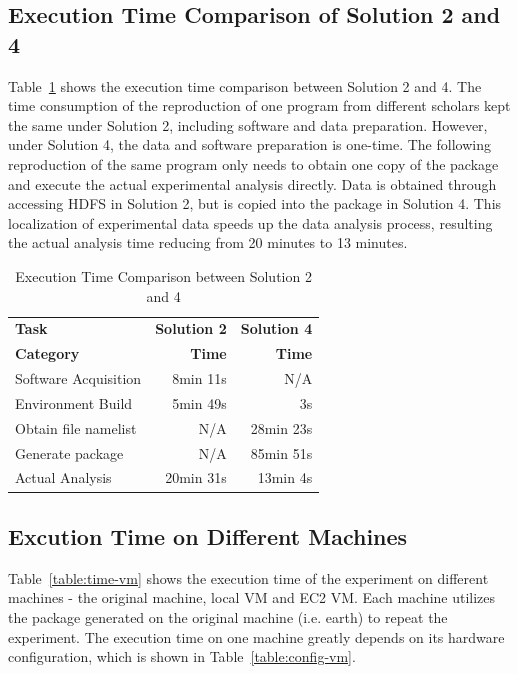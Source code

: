\documentclass{sig-alternate}
\begin{document}
\subsection{Execution Time Comparison of Solution 2 and 4}

Table~\ref{table:time-2nd3rd} shows the execution time comparison between
Solution 2 and 4. The time consumption of the reproduction of one program from
different scholars kept the same under Solution 2, including software and data
preparation. However, under Solution 4, the data and software preparation is
one-time. The following reproduction of the same program only needs to obtain
one copy of the package and execute the actual experimental analysis directly.
Data is obtained through accessing HDFS in Solution 2, but is copied into the package in Solution 4. This localization of experimental data speeds up the data analysis process, resulting the actual analysis time reducing from 20 minutes to 13 minutes.

\begin{table}
    \centering
    \begin{tabular}{|l|r|r|}
    \hline
    \bf Task & \bf Solution 2& \bf Solution 4\\ 
    \bf Category & \bf Time & \bf Time \\ \hline
    Software Acquisition & 8min 11s & N/A \\ \hline
    Environment Build & 5min 49s  & 3s \\ \hline
    Obtain file namelist & N/A & 28min 23s \\ \hline
    Generate package & N/A & 85min 51s \\ \hline
    Actual Analysis & 20min 31s & 13min 4s \\ \hline
    \end{tabular}
    \caption{Execution Time Comparison between Solution 2 and 4}
    \label{table:time-2nd3rd}
\end{table}    

\subsection{Excution Time on Different Machines}
Table~\ref{table:time-vm} shows the execution time of the experiment on different machines - the original machine, local VM and EC2 VM. 
Each machine utilizes the package generated on the original machine (i.e. earth) to repeat the experiment.
The execution time on one machine greatly depends on its hardware configuration, which is shown in Table~\ref{table:config-vm}.
\end{document}
